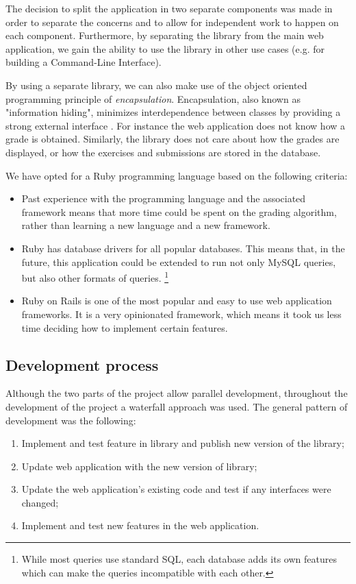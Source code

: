 The decision to split the application in two separate components was made in order to separate the concerns and to allow for independent work to happen on each component. Furthermore, by separating the library from the main web application, we gain the ability to use the library in other use cases (e.g. for building a Command-Line Interface).

By using a separate library, we can also make use of the object oriented programming principle of \textit{encapsulation}. Encapsulation, also known as "information hiding", minimizes interdependence between classes by providing a strong external interface \citep{Encapsulation}. For instance the web application does not know how a grade is obtained. Similarly, the library does not care about how the grades are displayed, or how the exercises and submissions are stored in the database.

We have opted for a Ruby programming language based on the following criteria:

\begin{itemize}
    \item Past experience with the programming language and the associated framework means that more time could be spent on the grading algorithm, rather than learning a new language and a new framework.
    \item Ruby has database drivers for all popular databases. This means that, in the future, this application could be extended to run not only MySQL queries, but also other formats of queries. \footnote{While most queries use standard SQL, each database adds its own features which can make the queries incompatible with each other.}
    \item Ruby on Rails is one of the most popular and easy to use web application frameworks. It is a very opinionated framework, which means it took us less time deciding how to implement certain features.
\end{itemize}

\subsection{Development process} \label{ch:reqandspec:sec:spec:subsec:dev_process}

Although the two parts of the project allow parallel development, throughout the development of the project a waterfall approach was used. The general pattern of development was the following:

\begin{enumerate}
  \item Implement and test feature in library and publish new version of the library;
  \item Update web application with the new version of library;
  \item Update the web application's existing code and test if any interfaces were changed;
  \item Implement and test new features in the web application.
\end{enumerate}

